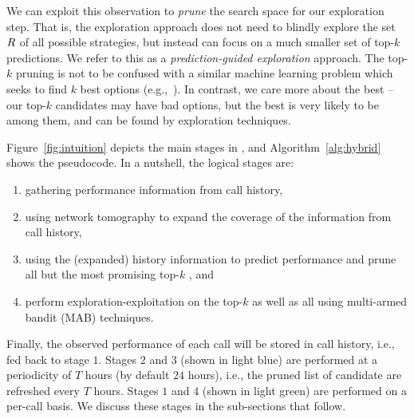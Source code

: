 We can exploit this observation to {\em prune} the search space for our
exploration  step. That is, the exploration approach does not need to blindly
explore the set   $R$ of all possible strategies, but instead can focus
on a much smaller set of top-$k$ predictions.  We refer to this as a {\em
prediction-guided exploration}  approach.  
The top-$k$ pruning is not to be confused with a similar machine learning problem which seeks to find $k$ best options (e.g.,~\cite{cao2015top}). In contrast, we care more about the best \option {} -- our top-$k$ candidates may have bad options, but the best \option is very likely to be among them, and can be found by exploration techniques.




Figure~\ref{fig:intuition} depicts the main stages in \hybrid, and Algorithm~\ref{alg:hybrid} shows the pseudocode. In a nutshell, the logical stages are: 
\begin{enumerate}
\item gathering performance information from call history, %
\item using network tomography to expand the coverage of the information from call history, %
\item using the (expanded) history information to predict performance and prune all but the most promising top-$k$ \options, and %
\item perform exploration-exploitation on the top-$k$ \options as well as all \options using multi-armed bandit (MAB) techniques.
\end{enumerate}

Finally, the observed performance of each call will be stored in call history, i.e., fed back to stage $1$.
Stages $2$ and $3$ (shown in light blue) %
are performed at a periodicity of $T$ hours (by default $24$ hours), i.e., the pruned list of candidate \options are refreshed every $T$ hours.  Stages $1$ and $4$ (shown in light green) are performed on a per-call basis.
We discuss these stages in the sub-sections that follow.

